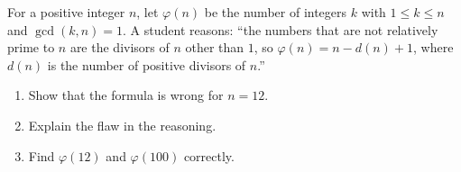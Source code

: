 For a positive integer $n$, let $\varphi(n)$ be the number of integers $k$ with $1\le k\le n$ and $\gcd(k,n)=1$. A student reasons: ``the numbers that are not relatively prime to $n$ are the divisors of $n$ other than $1$, so $\varphi(n)=n-d(n)+1$, where $d(n)$ is the number of positive divisors of $n$.''
\begin{enumerate}
\item[(a)] Show that the formula is wrong for $n=12$.
\item[(b)] Explain the flaw in the reasoning.
\item[(c)] Find $\varphi(12)$ and $\varphi(100)$ correctly.
\end{enumerate}
